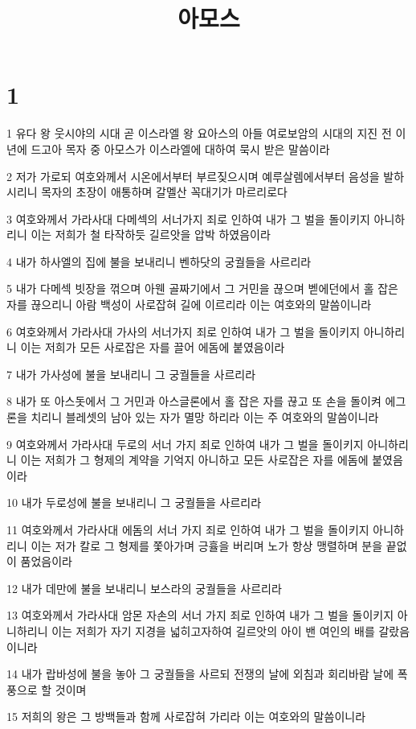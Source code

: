 

\title{아모스}


\chapter{1}

\par 1 유다 왕 웃시야의 시대 곧 이스라엘 왕 요아스의 아들 여로보암의 시대의 지진 전 이 년에 드고아 목자 중 아모스가 이스라엘에 대하여 묵시 받은 말씀이라
\par 2 저가 가로되 여호와께서 시온에서부터 부르짖으시며 예루살렘에서부터 음성을 발하시리니 목자의 초장이 애통하며 갈멜산 꼭대기가 마르리로다
\par 3 여호와께서 가라사대 다메섹의 서너가지 죄로 인하여 내가 그 벌을 돌이키지 아니하리니 이는 저희가 철 타작하듯 길르앗을 압박 하였음이라
\par 4 내가 하사엘의 집에 불을 보내리니 벤하닷의 궁궐들을 사르리라
\par 5 내가 다메섹 빗장을 꺾으며 아웬 골짜기에서 그 거민을 끊으며 벧에던에서 홀 잡은 자를 끊으리니 아람 백성이 사로잡혀 길에 이르리라 이는 여호와의 말씀이니라
\par 6 여호와께서 가라사대 가사의 서너가지 죄로 인하여 내가 그 벌을 돌이키지 아니하리니 이는 저희가 모든 사로잡은 자를 끌어 에돔에 붙였음이라
\par 7 내가 가사성에 불을 보내리니 그 궁궐들을 사르리라
\par 8 내가 또 아스돗에서 그 거민과 아스글론에서 홀 잡은 자를 끊고 또 손을 돌이켜 에그론을 치리니 블레셋의 남아 있는 자가 멸망 하리라 이는 주 여호와의 말씀이니라
\par 9 여호와께서 가라사대 두로의 서너 가지 죄로 인하여 내가 그 벌을 돌이키지 아니하리니 이는 저희가 그 형제의 계약을 기억지 아니하고 모든 사로잡은 자를 에돔에 붙였음이라
\par 10 내가 두로성에 불을 보내리니 그 궁궐들을 사르리라
\par 11 여호와께서 가라사대 에돔의 서너 가지 죄로 인하여 내가 그 벌을 돌이키지 아니하리니 이는 저가 칼로 그 형제를 쫓아가며 긍휼을 버리며 노가 항상 맹렬하며 분을 끝없이 품었음이라
\par 12 내가 데만에 불을 보내리니 보스라의 궁궐들을 사르리라
\par 13 여호와께서 가라사대 암몬 자손의 서너 가지 죄로 인하여 내가 그 벌을 돌이키지 아니하리니 이는 저희가 자기 지경을 넓히고자하여 길르앗의 아이 밴 여인의 배를 갈랐음이니라
\par 14 내가 랍바성에 불을 놓아 그 궁궐들을 사르되 전쟁의 날에 외침과 회리바람 날에 폭풍으로 할 것이며
\par 15 저희의 왕은 그 방백들과 함께 사로잡혀 가리라 이는 여호와의 말씀이니라

